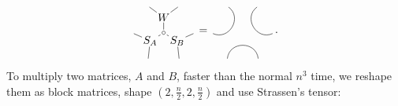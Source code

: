 \[
\begin{tikzpicture}[inner sep=1pt, baseline=.0em]
    \node (m) at (0,0) {$\sbullet$};
    \node (W) at (0,.5) {$W$};
    \node (SB) at (-30:.5) {$S_B$};
    \node (SA) at (-150:.5) {$S_A$};
    \node (w1) at (60:1) {};
    \node (w2) at (120:1) {};
    \node (sa1) at (-120:1) {};
    \node (sa2) at (-180:1) {};
    \node (sb1) at (-0:1) {};
    \node (sb2) at (-60:1) {};
    \draw (m) -- (W);
    \draw (m) -- (SA);
    \draw (m) -- (SB);
    \draw (W) -- (w1) {};
    \draw (W) -- (w2) {};
    \draw (SB) -- (sb1) {};
    \draw (SB) -- (sb2) {};
    \draw (SA) -- (sa1) {};
    \draw (SA) -- (sa2) {};
\end{tikzpicture}
=
\begin{tikzpicture}[inner sep=1pt, baseline=.0em]
    \node (m) at (0,0) {};
    \node (W) at (0,.5) {};
    \node (SB) at (-30:.5) {};
    \node (SA) at (-150:.5) {};
    \node (w1) at (60:1) {};
    \node (w2) at (120:1) {};
    \node (sa1) at (-120:1) {};
    \node (sa2) at (-180:1) {};
    \node (sb1) at (-0:1) {};
    \node (sb2) at (-60:1) {};
    \draw (sa2) .. controls (SA) and (W) .. (w2);
    \draw (sa1) .. controls (SA) and (SB) .. (sb2);
    \draw (sb1) .. controls (SB) and (W) .. (w1);
\end{tikzpicture}
.
\]
%
To multiply two matrices, $A$ and $B$, faster than the normal $n^3$ time,
we reshape them as block matrices, shape $(2,\frac n 2,2,\frac n 2)$ and use Strassen's tensor:
